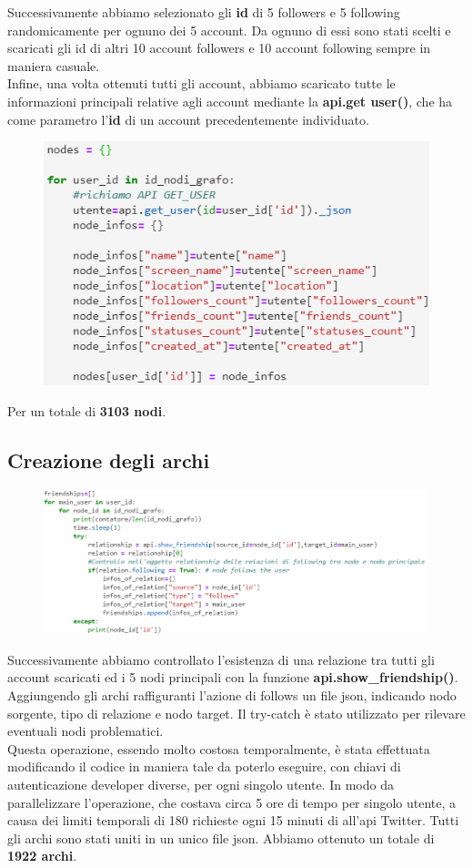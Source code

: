 \documentclass[a4paper,11pt]{report}
\begin{document}
Successivamente abbiamo selezionato gli \textbf{id} di 5 followers e 5 following randomicamente per ognuno dei 5 account. Da ognuno di essi sono stati scelti e scaricati gli id di altri 10 account followers e 10 account following sempre in maniera casuale.\\

Infine, una volta ottenuti tutti gli account, abbiamo scaricato tutte le informazioni principali relative agli account mediante la \textbf{api.get user()}, che ha come parametro l'\textbf{id} di un account precedentemente individuato.\\
\begin{figure}[ht]
	\centering
	\includegraphics[width=0.4\linewidth]{api_get_user}
	\label{fig:apigetuser}
\end{figure}

Per un totale di \textbf{3103 nodi}.
\subsection{Creazione degli archi}
\begin{figure}[h]
	\centering
	\includegraphics[width=0.8\linewidth]{api_show_friendships}
	\label{fig:apishowfriendships}
\end{figure}

Successivamente abbiamo controllato l'esistenza di una relazione tra tutti gli account scaricati ed i 5 nodi principali con la funzione \textbf{api.show\_friendship()}. Aggiungendo gli archi raffiguranti l'azione di follows un file json, indicando nodo sorgente, tipo di relazione e nodo target. Il try-catch è stato utilizzato per rilevare eventuali nodi problematici.\\
Questa operazione, essendo molto costosa temporalmente, è stata effettuata modificando il codice in maniera tale da poterlo eseguire, con chiavi di autenticazione developer diverse, per ogni singolo utente. In modo da parallelizzare l'operazione, che costava circa 5 ore di tempo per singolo utente, a causa dei limiti temporali di 180 richieste ogni 15 minuti di all'api Twitter. Tutti gli archi sono stati uniti in un unico file json. Abbiamo ottenuto un totale di \textbf{1922 archi}.
\end{document}
